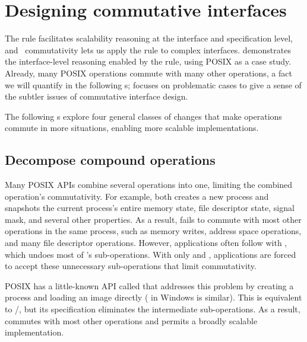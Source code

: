 \section{Designing commutative interfaces}
\label{sec:posix}


\noindent
The rule facilitates scalability reasoning at the interface and
specification level, and \SIM\ commutativity lets us apply the rule to
complex interfaces.
 demonstrates the interface-level reasoning enabled by the
rule, using POSIX as a case study.
%
Already, many POSIX operations commute with many other
operations, a fact we will quantify in the following s;
 focuses on
problematic cases to give a sense of the subtler issues of commutative
interface design.

The following s explore four general
classes of changes that make operations commute in more situations,
enabling more scalable implementations.



\subsection{Decompose compound operations}
\label{sec:posix:decompose}

Many POSIX APIs combine several operations into one, limiting the
combined operation's commutativity.
For example,
 both creates a new process and snapshots the current process's
entire memory state, file descriptor state, signal mask, and several
other properties.  As a result,  fails to commute
with most other operations in the same process, such as memory writes,
address space operations, and many file descriptor operations.
However, applications often follow  with
, which undoes most of 's sub-operations.
With only  and , applications are forced to accept
these unnecessary sub-operations that limit commutativity.

POSIX has a little-known API called  that
addresses this problem by creating a process and loading an image
directly ( in Windows is similar).  This is
equivalent to /, but its specification eliminates
the intermediate sub-operations.  As a result, 
commutes with most other operations and permits a broadly scalable
implementation.

